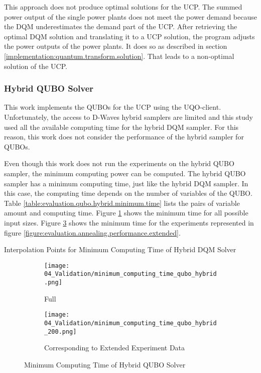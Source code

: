This approach does not produce optimal solutions for the UCP.
The summed power output of the single power plants does not meet the power demand because the DQM underestimates the demand part of the UCP.
After retrieving the optimal DQM solution and translating it to a UCP solution, the program adjusts the power outputs of the power plants.
It does so as described in section \ref{implementation:quantum.transform.solution}.
That leads to a non-optimal solution of the UCP.

\subsubsection{Hybrid QUBO Solver}

This work implements the QUBOs for the UCP using the UQO-client.
Unfortunately, the access to D-Waves hybrid samplers are limited and this study used all the available computing time for the hybrid DQM sampler.
For this reason, this work does not consider the performance of the hybrid sampler for QUBOs.

Even though this work does not run the experiments on the hybrid QUBO sampler, the minimum computing power can be computed.
The hybrid QUBO sampler has a minimum computing time, just like the hybrid DQM sampler.
In this case, the computing time depends on the number of variables of the QUBO.
Table \ref{table:evaluation.qubo.hybrid.minimum.time} lists the pairs of variable amount and computing time.
Figure \ref{figure:evaluation.qubo.hybrid.minimum.time} shows the minimum time for all possible input sizes.
Figure \ref{figure:evaluation.qubo.hybrid.minimum.time.200} shows the minimum time for the experiments represented in figure \ref{figure:evaluation.annealing.performance.extended}.

\begin{table}[ht]
  \centering
  
  \caption{Interpolation Points for Minimum Computing Time of Hybrid DQM Solver}
  \label{table:evaluation.qubo.hybrid.minimum.time}
\end{table}
\begin{figure} [ht]
  \begin{subfigure}[b]{0.5 \textwidth}
    \centering
    \texttt{[image: 04\_Validation/minimum\_computing\_time\_qubo\_hybrid.png]}
    \caption{Full}
    \label{figure:evaluation.qubo.hybrid.minimum.time}
  \end{subfigure}
  \begin{subfigure}[b]{0.5 \textwidth}
    \centering
    \texttt{[image: 04\_Validation/minimum\_computing\_time\_qubo\_hybrid\_200.png]}
    \caption{Corresponding to Extended Experiment Data}
    \label{figure:evaluation.qubo.hybrid.minimum.time.200}
  \end{subfigure}
  \caption{Minimum Computing Time of Hybrid QUBO Solver}
\end{figure}


